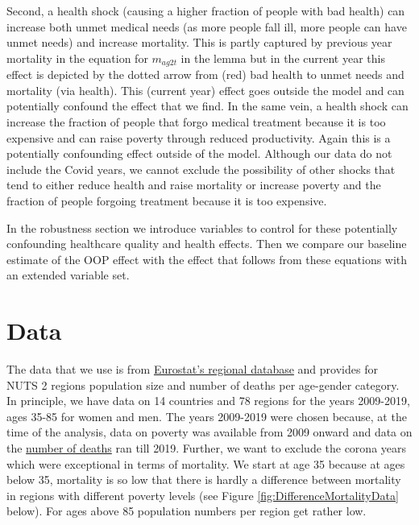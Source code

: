 \documentclass[a4paper,12pt]{article}
\begin{document}
Second, a health shock (causing a higher fraction of people with bad health) can increase both unmet medical needs (as more people fall ill, more people can have unmet needs) and increase mortality. This is partly captured by previous year mortality in the equation for \(m_{ag2t}\) in the lemma but in the current year this effect is depicted by the dotted arrow from (red) bad health to unmet needs and mortality (via health). This (current year) effect goes outside the model and can potentially confound the effect that we find. In the same vein, a health shock can increase the fraction of people that forgo medical treatment because it is too expensive and can raise poverty through reduced productivity. Again this is a potentially confounding effect outside of the model. Although our data do not include the Covid years, we cannot exclude the possibility of other shocks that tend to either reduce health and raise mortality or increase poverty and the fraction of people forgoing treatment because it is too expensive.

In the robustness section we introduce variables to control for these potentially confounding healthcare quality and health effects. Then we compare our baseline estimate of the OOP effect with the effect that follows from these equations with an extended variable set. 


\section{Data}
\label{sec:orgcd9cda3}

The data that we use is from \href{https://ec.europa.eu/eurostat/web/regions/data/database}{Eurostat's regional database} and provides for NUTS 2 regions population size and number of deaths per age-gender category. In principle, we have data on 14 countries and 78 regions for the years 2009-2019, ages 35-85 for women and men. The years 2009-2019 were chosen  because, at the time of the analysis, data on poverty was available from 2009 onward and data on the \href{https://ec.europa.eu/eurostat/databrowser/view/demo\_r\_magec/default/table?lang=en}{number of deaths} ran till 2019. Further, we want to exclude the corona years which were exceptional in terms of mortality. We start at age 35 because at ages below 35, mortality is so low that there is hardly a difference between mortality in regions with different poverty levels (see Figure \ref{fig:DifferenceMortalityData} below). For ages above 85 population numbers per region get rather low. 
\end{document}

